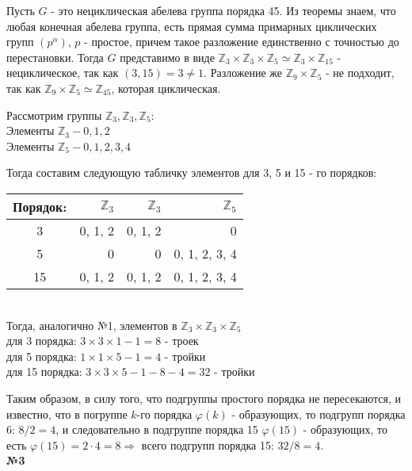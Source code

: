 \documentclass[a4paper, 12pt]{article}
\begin{document}
	Пусть $G$ - это нециклическая абелева группа порядка 45. Из теоремы знаем, что любая конечная абелева группа, есть прямая  сумма примарных циклических групп $(p^\alpha)$, $p$ - простое, причем такое разложение единственно с точностью до перестановки. Тогда $G$ представимо в виде $\mathbb Z_3 \times \mathbb Z_3 \times \mathbb Z_5 \simeq \mathbb Z_3 \times \mathbb Z_{15}$ - нециклическое, так как $(3, 15) = 3 \neq 1$. Разложение же $\mathbb Z_9 \times \mathbb Z_5$ - не подходит, так как $\mathbb Z_9 \times \mathbb Z_5 \simeq \mathbb Z_{45}$, которая циклическая.
	
	Рассмотрим группы $\mathbb Z_3, \mathbb Z_3, \mathbb Z_5:$ \\
	Элементы $\mathbb Z_3 - 0, 1, 2$ \\
	Элементы $\mathbb Z_5 - 0, 1, 2, 3, 4$
	
	Тогда составим следующую табличку элементов для 3, 5 и 15 - го порядков: \\
	\begin{tabular}{|c|r|r|r|} \hline
		Порядок:  & $ \mathbb Z_3 $ & $ \mathbb Z_3 $ & $ \mathbb Z_5 $  \\ \hline
		3 & 0, 1, 2 & 0, 1, 2 & 0  \\ \hline
		5 & 0 & 0 & 0, 1, 2, 3, 4 \\ \hline
		15 & 0, 1, 2 & 0, 1, 2 & 0, 1, 2, 3, 4 \\ \hline
	\end{tabular} \\

	Тогда, аналогично №1, элементов в $\mathbb Z_3 \times \mathbb Z_3 \times \mathbb Z_5$ \\
	для 3 порядка: $3 \times 3 \times 1 - 1 = 8$ - троек \\
	для 5 порядка: $1 \times 1 \times 5 - 1 = 4$ - тройки \\
	для 15 порядка: $3 \times 3 \times 5 - 1 - 8 - 4 = 32$ - тройки
	
	Таким образом, в силу того, что подгруппы простого порядка не пересекаются, и известно, что в погруппе $k$-го порядка $\varphi(k)$ - образующих, то подгрупп порядка 6: $8 / 2 = 4$, и следовательно в подгруппе порядка 15 $\varphi(15)$ - образующих, то есть $\varphi(15) = 2 \cdot 4 = 8 \Rightarrow$ всего подгрупп порядка 15:  $32 / 8 = 4$. \\
	
	\textbf{№3} \\
	
\end{document}
